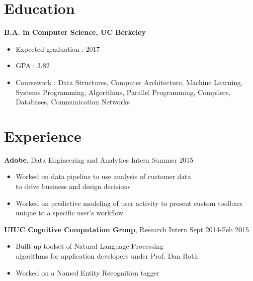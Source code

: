 \documentclass[margin]{res}
\begin{document}
 


\begin{resume} 
  

  \section{Education} 
          {\bf B.A. in Computer Science, UC Berkeley}
          \begin{itemize} \itemsep -3pt
          \item Expected graduation : 2017
	  \item GPA : 3.82
          \item Coursework : Data Structures, Computer Architecture,
              Machine Learning, \\Systems Programming, Algorithms, Parallel
              Programming, Compilers, \\Databases, Communication Networks
          \end{itemize}
          

          \section{Experience}
                  {\bf Adobe}, Data Engineering and Analytics Intern \hfill Summer 2015
                  \begin{itemize} \itemsep -3pt
                  \item Worked on data pipeline to use analysis of customer data \\to drive business and design decisions
                  \item Worked on predictive modeling of user activity to present custom toolbars unique to a specific user's workflow
                  \end{itemize}
                  
                  {\bf UIUC Cognitive Computation Group}, Research Intern \hfill Sept 2014-Feb 2015
                  \begin{itemize} \itemsep -3pt
                  \item Built up toolset of Natural Language Processing \\
                    algorithms for application developers under Prof. Dan Roth
                  \item Worked on a Named Entity Recognition tagger
                  \end{itemize}
                  

\end{resume}
\end{document}
